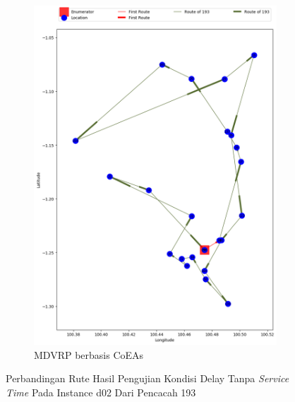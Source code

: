 \begin{figure}[H]
	\centering
	\begin{subfigure}[t]{\textwidth}
		\centering
		\includegraphics[width=\textwidth]{Resources/Images/delayed_2/real_m15_n100_delayed_2_193_coes}
		\caption{MDVRP berbasis CoEAs}
		\label{fig:real_m15_n100_delayed_2_193_coes}
	\end{subfigure}
	\caption{Perbandingan Rute Hasil Pengujian Kondisi Delay Tanpa \textit{Service Time} Pada Instance d02 Dari Pencacah 193}
	\label{fig:real_m15_n100_delayed_2_193}
\end{figure}


